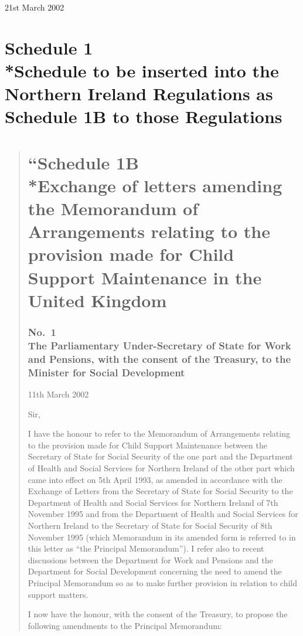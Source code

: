 \documentclass[12pt,a4paper]{article}
\begin{document}
21st March 2002

\small

\part[Schedule 1 --- Schedule to be inserted into the Northern Ireland Regulations as Schedule 1B to those Regulations]{Schedule 1\\*Schedule to be inserted into the Northern Ireland Regulations as Schedule 1B to those Regulations}

\begin{quotation}
\part*{“Schedule 1B\\*Exchange of letters amending the Memorandum of Arrangements relating to the provision made for Child Support Maintenance in the United Kingdom}

\section*{No.\ 1\\The Parliamentary Under-Secretary of State for Work and Pensions, with the consent of the Treasury, to the Minister for Social Development}

11th March 2002

Sir,

I have the honour to refer to the Memorandum of Arrangements relating to the provision made for Child Support Maintenance between the Secretary of State for Social Security of the one part and the Department of Health and Social Services for Northern Ireland of the other part which came into effect on 5th April 1993, as amended in accordance with the Exchange of Letters from the Secretary of State for Social Security to the Department of Health and Social Services for Northern Ireland of 7th November 1995 and from the Department of Health and Social Services for Northern Ireland to the Secretary of State for Social Security of 8th November 1995 (which Memorandum in its amended form is referred to in this letter as “the Principal Memorandum”). I refer also to recent discussions between the Department for Work and Pensions and the Department for Social Development concerning the need to amend the Principal Memorandum so as to make further provision in relation to child support matters.

I now have the honour, with the consent of the Treasury, to propose the following amendments to the Principal Memorandum:


\end{quotation}
\end{document}
